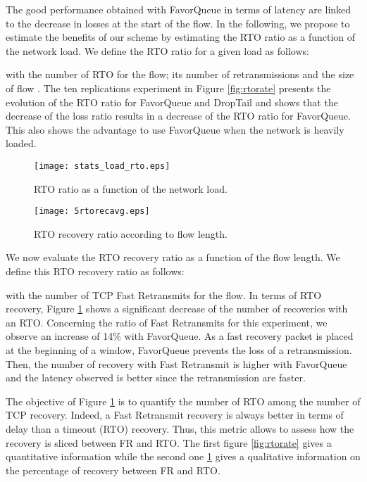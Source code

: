 \documentclass{elsart}
\begin{document}
The good performance obtained with FavorQueue in terms of latency are linked to the decrease in losses at the start of the flow.
In the following, we propose to estimate the benefits of our scheme by estimating the RTO ratio as a function of the network load. 
We define the RTO ratio  for a given load  as follows:

with  the number of RTO for the  flow;  its number of retransmissions and  the size of flow .
The ten replications experiment in Figure \ref{fig:rtorate} presents the evolution of the RTO ratio for FavorQueue and DropTail and shows that the decrease of the loss ratio results 
in a decrease of the RTO ratio for FavorQueue. This also shows the advantage to use FavorQueue when the network is heavily loaded.


\begin{figure}[htb!]
   \begin{minipage}[b]{1.0\columnwidth}
	\centering
	\texttt{[image: stats\_load\_rto.eps]}
	\caption{RTO ratio as a function of the network load.}
	\label{fig:rtorate}
   \end{minipage}

   \begin{minipage}[b]{1.0\columnwidth}   
	\centering
	\texttt{[image: 5rtorecavg.eps]}
	\caption{RTO recovery ratio according to flow length.}
	\label{fig:rtorec}
   \end{minipage}
\end{figure}

We now evaluate the RTO recovery ratio as a function of the flow length. We define this RTO recovery ratio as follows:

with  the number of TCP Fast Retransmits for the  flow. In terms of RTO recovery, Figure \ref{fig:rtorec} shows a significant decrease of 
the number of recoveries with an RTO. Concerning the ratio of Fast Retransmits for this experiment, we observe an increase of 14\% with FavorQueue. 
As a fast recovery packet is placed at the beginning of a window, FavorQueue prevents the loss of a retransmission. 
Then, the number of recovery with Fast Retransmit is higher with FavorQueue and the latency observed is better since the retransmission are faster.

The objective of Figure \ref{fig:rtorec} is to quantify the number of RTO among the number of TCP recovery. Indeed, a Fast Retransmit recovery is always better in terms of delay than a timeout (RTO) recovery. Thus, this metric allows to assess how the recovery is sliced between FR and RTO. The first figure \ref{fig:rtorate} gives a quantitative information while the second one \ref{fig:rtorec} gives a qualitative information on the percentage of recovery between FR and RTO.
\end{document}

